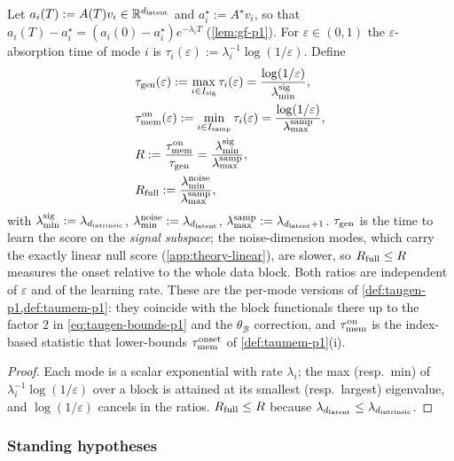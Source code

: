 \begin{definition}\label{def:abs-times-buf}
Let $a_i(T):=A(T)v_i\in\mathbb{R}^{d_{\mathrm{latent}}}$ and $a_i^\star:=A^\star v_i$, so that $a_i(T)-a_i^\star=(a_i(0)-a_i^\star)e^{-\lambda_iT}$ (\cref{lem:gf-p1}). For $\varepsilon\in(0,1)$ the $\varepsilon$-absorption time of mode $i$ is $\tau_i(\varepsilon):=\lambda_i^{-1}\log(1/\varepsilon)$. Define
\begin{equation}\label{eq:def-R-buf}
\begin{aligned}
&\tau_{\mathrm{gen}}(\varepsilon):=\max_{i\in I_{\rm sig}}\tau_i(\varepsilon)=\frac{\log(1/\varepsilon)}{\lambda^{\rm sig}_{\min}},\\ &
\tau_{\mathrm{mem}}^{\rm on}(\varepsilon):=\min_{i\in I_{\rm samp}}\tau_i(\varepsilon)=\frac{\log(1/\varepsilon)}{\lambda^{\rm samp}_{\max}},\\ &
R:=\frac{\tau_{\mathrm{mem}}^{\rm on}}{\tau_{\mathrm{gen}}}=\frac{\lambda^{\rm sig}_{\min}}{\lambda^{\rm samp}_{\max}},\\ &
R_{\rm full}:=\frac{\lambda^{\rm noise}_{\min}}{\lambda^{\rm samp}_{\max}},
\end{aligned}
\end{equation}
with $\lambda^{\rm sig}_{\min}:=\lambda_{d_{\mathrm{intrinsic}}}$, $\lambda^{\rm noise}_{\min}:=\lambda_{d_{\mathrm{latent}}}$, $\lambda^{\rm samp}_{\max}:=\lambda_{d_{\mathrm{latent}}+1}$. $\tau_{\mathrm{gen}}$ is the time to learn the score on the \emph{signal subspace}; the noise-dimension modes, which carry the exactly linear null score (\cref{app:theory-linear}), are slower, so $R_{\rm full}\le R$ measures the onset relative to the whole data block. Both ratios are independent of $\varepsilon$ and of the learning rate. These are the per-mode versions of \cref{def:taugen-p1,def:taumem-p1}: they coincide with the block functionals there up to the factor $2$ in \eqref{eq:taugen-bounds-p1} and the $\theta_{\mathcal B}$ correction, and $\tau_{\mathrm{mem}}^{\rm on}$ is the index-based statistic that lower-bounds $\tau_{\mathrm{mem}}^{\rm onset}$ of \cref{def:taumem-p1}(i).
\end{definition}
\begin{proof}
Each mode is a scalar exponential with rate $\lambda_i$; the max (resp.\ min) of $\lambda_i^{-1}\log(1/\varepsilon)$ over a block is attained at its smallest (resp.\ largest) eigenvalue, and $\log(1/\varepsilon)$ cancels in the ratios. $R_{\rm full}\le R$ because $\lambda_{d_{\mathrm{latent}}}\le\lambda_{d_{\mathrm{intrinsic}}}$.
\end{proof}

\subsubsection{Standing hypotheses}

